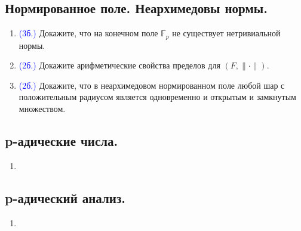 \documentclass[11pt]{article}
\begin{document}
    \subsection{Нормированное поле. Неархимедовы нормы.}
    \begin{enumerate}[start=1,label={\bfseries \arabic*.}]
        \item \textcolor{blue}{(3б.)} Докажите, что на конечном поле $\mathbb{F}_{p}$ не существует нетривиальной нормы.

        \item \textcolor{blue}{(2б.)} Докажите арифметические свойства пределов для $(F, \| \cdot \|)$.

        \item \textcolor{blue}{(2б.)} Докажите, что в неархимедовом нормированном поле любой шар с положительным радиусом является одновременно и открытым
              и замкнутым множеством.
    \end{enumerate}
    \subsection{p-адические числа.}
    \begin{enumerate}[start=1,label={\bfseries \arabic*.}]
        \item
    \end{enumerate}
    \subsection{p-адический анализ.}
    \begin{enumerate}[start=1,label={\bfseries \arabic*.}]
        \item
    \end{enumerate}
\end{document}
